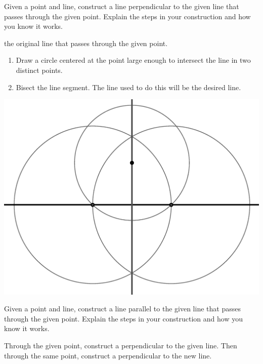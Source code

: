 \documentclass[nooutcomes]{ximera}
\begin{document}
\begin{problem}
Given a point and line, construct a line perpendicular to the given line that passes through the given point. Explain the steps in your construction and how you know it works.
\begin{freeResponse}
\begin{hint}%
the original line that passes through the given point.
\begin{enumerate}
\item Draw a circle centered at the point large enough  
       to intersect the line in two distinct points.
\item Bisect the line segment. The line used to do this 
       will be the desired line.
\end{enumerate}
\begin{image}
\includegraphics{perpfrompoint.png}
\end{image}
\end{hint}
\end{freeResponse}
\end{problem}

\begin{problem}
Given a point and line, construct a line parallel to the given line that passes through the given point. Explain the steps in your construction and how you know it works.
\begin{freeResponse}
\begin{hint}
Through the given point, construct a perpendicular to the given line.  Then through the same point, construct a perpendicular to the new line. 
\end{hint}
\end{freeResponse}
\end{problem}
\end{document}
